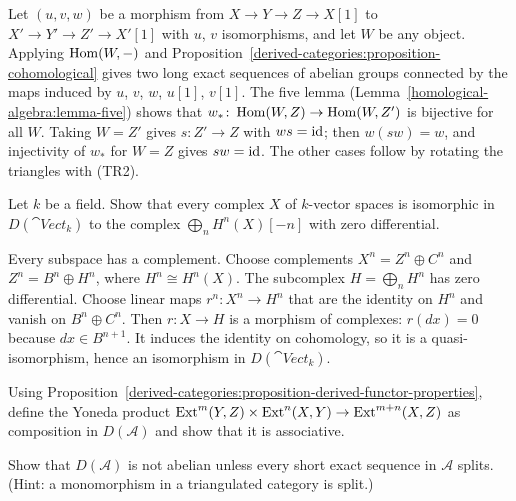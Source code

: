 \begin{solution}
Let $(u, v, w)$ be a morphism from $X \to Y \to Z \to X[1]$ to $X' \to Y' \to Z' \to X'[1]$ with $u$, $v$ isomorphisms, and let $W$ be any object.
Applying $\operatorname{Hom}(W, -)$ and Proposition~\ref{derived-categories:proposition-cohomological} gives two long exact sequences of abelian groups
connected by the maps induced by $u$, $v$, $w$, $u[1]$, $v[1]$. The five lemma (Lemma~\ref{homological-algebra:lemma-five}) shows that
$w_* \colon \operatorname{Hom}(W, Z) \to \operatorname{Hom}(W, Z')$ is bijective for all $W$. Taking $W = Z'$ gives $s \colon Z' \to Z$ with $ws = \mathrm{id}$; then $w(sw) = w$, and
injectivity of $w_*$ for $W = Z$ gives $sw = \mathrm{id}$. The other cases follow by rotating the triangles with (TR2).
\end{solution}

\begin{exercise}\label{derived-categories:exercise-split-complex}
Let $k$ be a field. Show that every complex $X$ of $k$-vector spaces is isomorphic in $D(\cat{Vect}_k)$ to the complex $\bigoplus_n H^n(X)[-n]$ with
zero differential.
\end{exercise}

\begin{solution}
Every subspace has a complement. Choose complements $X^n = Z^n \oplus C^n$ and $Z^n = B^n \oplus H^n$, where $H^n \cong H^n(X)$. The subcomplex
$H = \bigoplus_n H^n$ has zero differential. Choose linear maps $r^n \colon X^n \to H^n$ that are the identity on $H^n$ and vanish on $B^n \oplus C^n$. Then
$r \colon X \to H$ is a morphism of complexes: $r(dx) = 0$ because $dx \in B^{n+1}$. It induces the identity on cohomology, so it is a
quasi-isomorphism, hence an isomorphism in $D(\cat{Vect}_k)$.
\end{solution}

\begin{exercise}\label{derived-categories:exercise-ext-composition}
Using Proposition~\ref{derived-categories:proposition-derived-functor-properties}, define the Yoneda product
$\operatorname{Ext}^m(Y, Z) \times \operatorname{Ext}^n(X, Y) \to \operatorname{Ext}^{m+n}(X, Z)$ as composition in $D(\mathcal{A})$ and show that it is associative.
\end{exercise}

\begin{exercise}\label{derived-categories:exercise-not-abelian}
Show that $D(\mathcal{A})$ is not abelian unless every short exact sequence in $\mathcal{A}$ splits. (Hint: a monomorphism in a triangulated category
is split.)
\end{exercise}

